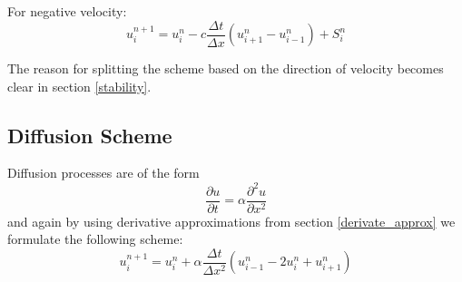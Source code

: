 \documentclass[]{article}
\begin{document}
For negative velocity:
\begin{equation} \label{advection_scheme_downwind}
u_{i}^{n+1}=u_{i}^{n}-c\frac{\Delta t}{\Delta x} (u_{i+1}^{n}-u_{i-1}^{n}) +S_{i}^{n}
\end{equation}

The reason for splitting the scheme based on the direction of velocity becomes clear in section \ref{stability}.

\subsection{Diffusion Scheme}
Diffusion processes are of the form
\begin{equation*}
\frac{\partial u}{\partial t} = \alpha \frac{\partial^2 u}{\partial x^2}
\end{equation*}
and again by using derivative approximations from section \ref{derivate_approx} we
formulate the following scheme:
\begin{equation} \label{diffusion_scheme}
u_{i}^{n+1}=u_{i}^ {n}+\alpha\frac{\Delta t}{\Delta x^{2}} (u_{i-1}^{n}-2u_{i}^{n}+u_{i+1}^{n})
\end{equation}
\end{document}

